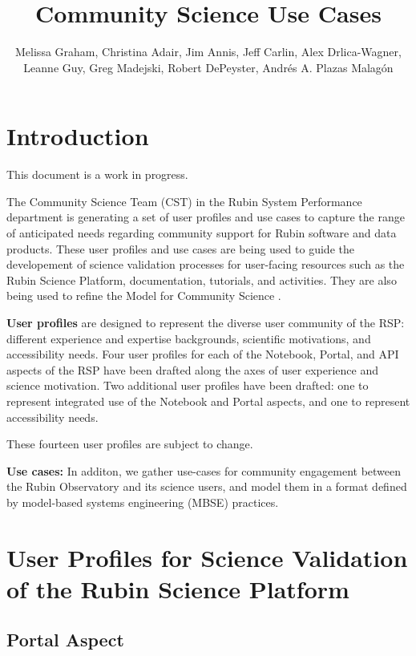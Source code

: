 \documentclass[DM,lsstdraft,authoryear,toc]{lsstdoc}
\title{Community Science Use Cases}
\author{%
Melissa Graham, Christina Adair, Jim Annis, Jeff Carlin, Alex Drlica-Wagner, Leanne Guy, Greg Madejski, Robert DePeyster, Andrés A. Plazas Malagón
}
\date{\vcsDate}
\begin{document}
\maketitle


\section{Introduction}

This document is a work in progress.

The Community Science Team (CST) in the Rubin System Performance department is generating a set of user profiles and use cases
to capture the range of anticipated needs regarding community support for Rubin software and data products.
These user profiles and use cases are being used to guide the developement of science validation processes for
user-facing resources such as the Rubin Science Platform, documentation, tutorials, and activities.
They are also being used to refine the Model for Community Science .

\textbf{User profiles} are designed to represent the diverse user community of the RSP:
different experience and expertise backgrounds, scientific motivations, and accessibility needs.
Four user profiles for each of the Notebook, Portal, and API aspects of the RSP have been drafted along
the axes of user experience and science motivation.
Two additional user profiles have been drafted: one to represent integrated use of the Notebook and Portal aspects,
and one to represent accessibility needs.

These fourteen user profiles are subject to change.

\textbf{Use cases:}
In additon, we gather use-cases for community engagement between the Rubin Observatory and its science users, and model them in a format defined by model-based systems engineering (MBSE) practices.

\clearpage
\section{User Profiles for Science Validation of the Rubin Science Platform}

\clearpage
\subsection{Portal Aspect}

\end{document}
